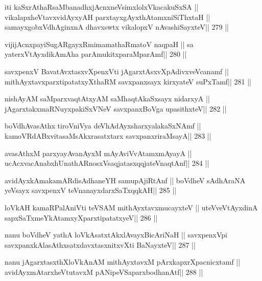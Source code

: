 \begin{shl}
iti kaSxrAthaRsaMbanadhxjAcnxneV\s simxlolxVkacakuSxSA ||
vikalapxheVtavxvidAyxyAH parxtayxgAyxthAtamxniSiThxtaH ||
samayxgobxVdhAginxnA dhavxswtx vikalopxV nAvashiSayxteV\hfill || 279 ||
\end{shl}

\begin{shl}
vijijAcnxpayiSugARgayxRmimamathaRmatoV naqpaH ||
sa yaterxVtAyxdikAmAha parAmukitxparaMparAmf\hfill || 280 ||
\end{shl}

\begin{shl}
savxpenxV BavatAvxtasxvXpenxVti jAgarxtAsxvXpAdivxveVcanamf ||
mithAyxtavxparxtipatatxyXthaRM savxpanxsayx kirxyateV suPxTamf\hfill || 281 ||
\end{shl}

\begin{shl}
nishAyAM saMparxvaqtAtxyAM saMhaqtAkaSxsayx nidarxyA ||
jAgarxtakxmaRNuyxpakiSxVNeV savxpanxBoVga upasithxteV\hfill || 282 ||
\end{shl}

\begin{shl}
boVdhAvasAthx tiroVniVya deVhAdAyxsharxyalakaSxNAmf ||
kamoVRdABxvitasaMsAkxrasatxtarx savxpanxriraMsayA\hfill || 283 ||
\end{shl}

\begin{shl}
avasAthxM parxyayAvanAyxM mAyAviVvA\s\s tamxmAyayA ||
ucAcxvacAnabxhUnathARnosxV\s saqjatasxqqjateV\s naqtAnf\hfill || 284 ||
\end{shl}

\begin{shl}
avidAyxkAmakamARdisAdhaneYH samupAjiRtAnf ||
boVdheV sAdhAraNA yeV\s sayx savxpenxV teV\s nanayxdarxSaTxqqkAH\hfill || 285 ||
\end{shl}

\begin{shl}
loVkAH kamaRPalAniVti teVSAM mithAyxtavxmucayxteV ||
uteVveVtAyxdinA sapxSaTxmeYkAtamxyXparxtipatatxyeV\hfill || 286 ||
\end{shl}

\begin{shl}
nanu boVdheV yathA loVkAsatxtAkxlAvayxBicAriNaH ||
savxpenxV\s pi savxpanxkAlasAthxsatxdavxtasxnitxvXti BaNayxteV\hfill || 287 ||
\end{shl}

\begin{shl}
nanu jAgarxtasxthXloVkAnAM mithAyxtavxM pArxkapxrXpacnicxtamf ||
avidAyxmAtarxheVtutavxM pANipeVSaparxbodhanAtf\hfill || 288 ||
\end{shl}

